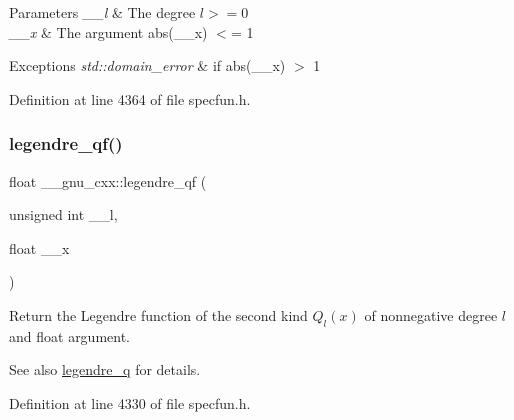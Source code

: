 \begin{DoxyParams}{Parameters}
{\em \+\_\+\+\_\+l} & The degree $ l >= 0 $ \\
\hline
{\em \+\_\+\+\_\+x} & The argument {\ttfamily abs(\+\_\+\+\_\+x)} $<$= 1 \\
\hline
\end{DoxyParams}

\begin{DoxyExceptions}{Exceptions}
{\em std\+::domain\+\_\+error} & if {\ttfamily abs(\+\_\+\+\_\+x)} $>$ 1 \\
\hline
\end{DoxyExceptions}


Definition at line 4364 of file specfun.\+h.

\mbox{\label{group__gnu__math__spec__func_ga46cf4d58886af402c6776bc090b4e4a7}} 
\subsubsection{\texorpdfstring{legendre\+\_\+qf()}{legendre\_qf()}}
{\footnotesize\ttfamily float \+\_\+\+\_\+gnu\+\_\+cxx\+::legendre\+\_\+qf (\begin{DoxyParamCaption}\item[{unsigned int}]{\+\_\+\+\_\+l,  }\item[{float}]{\+\_\+\+\_\+x }\end{DoxyParamCaption})\hspace{0.3cm}{\ttfamily [inline]}}

Return the Legendre function of the second kind $ Q_l(x) $ of nonnegative degree $ l $ and {\ttfamily float} argument.

\begin{DoxySeeAlso}{See also}
\hyperlink{group__gnu__math__spec__func_gadad5b22d0075dca31690907668af568f}{legendre\+\_\+q} for details. 
\end{DoxySeeAlso}


Definition at line 4330 of file specfun.\+h.

\mbox{\label{group__gnu__math__spec__func_ga60feac5a8bd733abee6610adf15208f2}} 
